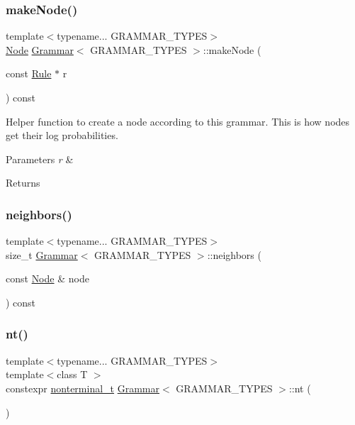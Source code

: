 \subsubsection{\texorpdfstring{make\+Node()}{makeNode()}}
{\footnotesize\ttfamily template$<$typename... G\+R\+A\+M\+M\+A\+R\+\_\+\+T\+Y\+P\+ES$>$ \\
\hyperlink{class_node}{Node} \hyperlink{class_grammar}{Grammar}$<$ G\+R\+A\+M\+M\+A\+R\+\_\+\+T\+Y\+P\+ES $>$\+::make\+Node (\begin{DoxyParamCaption}\item[{const \hyperlink{class_rule}{Rule} $\ast$}]{r }\end{DoxyParamCaption}) const\hspace{0.3cm}{\ttfamily [inline]}}

Helper function to create a node according to this grammar. This is how nodes get their log probabilities. 
\begin{DoxyParams}{Parameters}
{\em r} & \\
\hline
\end{DoxyParams}
\begin{DoxyReturn}{Returns}

\end{DoxyReturn}
\mbox{\label{class_grammar_a486cec3b8e6c757eb348031ff8118a99}} 
\subsubsection{\texorpdfstring{neighbors()}{neighbors()}}
{\footnotesize\ttfamily template$<$typename... G\+R\+A\+M\+M\+A\+R\+\_\+\+T\+Y\+P\+ES$>$ \\
size\+\_\+t \hyperlink{class_grammar}{Grammar}$<$ G\+R\+A\+M\+M\+A\+R\+\_\+\+T\+Y\+P\+ES $>$\+::neighbors (\begin{DoxyParamCaption}\item[{const \hyperlink{class_node}{Node} \&}]{node }\end{DoxyParamCaption}) const\hspace{0.3cm}{\ttfamily [inline]}}

\mbox{\label{class_grammar_a047b55bfbd87c52e9d969af62c2932ab}} 
\subsubsection{\texorpdfstring{nt()}{nt()}}
{\footnotesize\ttfamily template$<$typename... G\+R\+A\+M\+M\+A\+R\+\_\+\+T\+Y\+P\+ES$>$ \\
template$<$class T $>$ \\
constexpr \hyperlink{_nonterminal_8h_a5c1f658dc7560600a16d22408bd716ca}{nonterminal\+\_\+t} \hyperlink{class_grammar}{Grammar}$<$ G\+R\+A\+M\+M\+A\+R\+\_\+\+T\+Y\+P\+ES $>$\+::nt (\begin{DoxyParamCaption}{ }\end{DoxyParamCaption})\hspace{0.3cm}{\ttfamily [inline]}}

